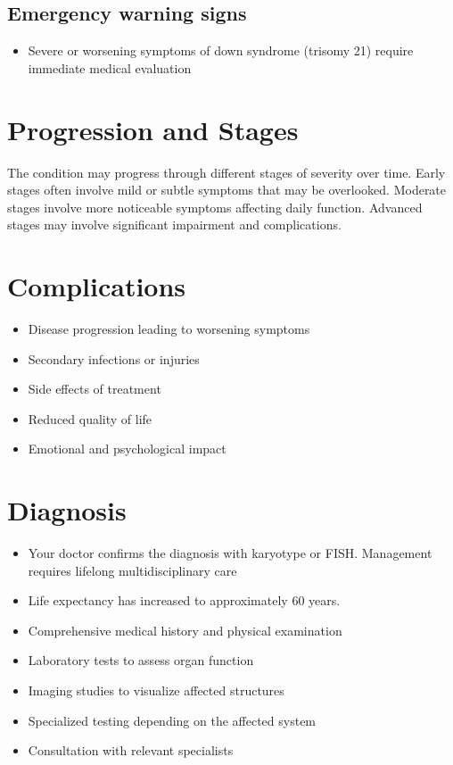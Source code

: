 \subsection{Emergency warning signs}
\begin{itemize}[noitemsep]
  \item Severe or worsening symptoms of down syndrome (trisomy 21) require immediate medical evaluation
\end{itemize}
\section{Progression and Stages}
The condition may progress through different stages of severity over time. Early stages often involve mild or subtle symptoms that may be overlooked. Moderate stages involve more noticeable symptoms affecting daily function. Advanced stages may involve significant impairment and complications.
\section{Complications}
\begin{itemize}[noitemsep]
  \item Disease progression leading to worsening symptoms
  \item Secondary infections or injuries
  \item Side effects of treatment
  \item Reduced quality of life
  \item Emotional and psychological impact
\end{itemize}
\section{Diagnosis}
\begin{itemize}[noitemsep]
  \item Your doctor confirms the diagnosis with karyotype or FISH. Management requires lifelong multidisciplinary care
  \item Life expectancy has increased to approximately 60 years.
  \item Comprehensive medical history and physical examination
  \item Laboratory tests to assess organ function
  \item Imaging studies to visualize affected structures
  \item Specialized testing depending on the affected system
  \item Consultation with relevant specialists
\end{itemize}
